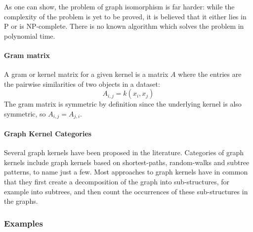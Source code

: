As one can show, the problem of graph isomorphism is far harder: while the complexity of the problem is yet to be proved, it is believed that it either lies in P or is NP-complete. There is no known algorithm which solves the problem in polynomial time.



\paragraph{Gram matrix}
A gram or kernel matrix for a given kernel is a matrix $A$ where the entries are the pairwise similarities of two objects in a dataset:
\begin{equation*}
    A_{i,j} = k(x_i, x_j)
\end{equation*}
The gram matrix is symmetric by definition since the underlying kernel is also symmetric, so $A_{i,j} = A_{j, i}$.

\paragraph{Graph Kernel Categories}
Several graph kernels have been proposed in the literature.
Categories of graph kernels include graph kernels based on shortest-paths, random-walks and subtree patterns, to name just a few.
Most approaches to graph kernels have in common that they first create a decomposition of the graph into sub-structures, for example into subtrees, and then count the occurrences of these sub-structures in the graphs.


\subsubsection{Examples}
